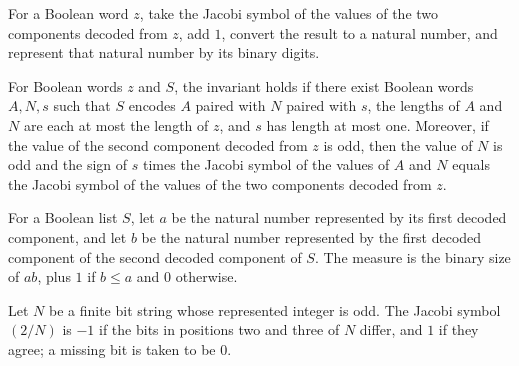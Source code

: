\begin{definition}
\label{Complexity.BinArith.jacobi}
\leanok
{}
For a Boolean word $z$, take the Jacobi symbol of the values of the two components
decoded from $z$, add $1$, convert the result to a natural number, and represent that
natural number by its binary digits.
\end{definition}

\begin{definition}
\label{Complexity.BinArith.JacInv}
\leanok
{}
For Boolean words $z$ and $S$, the invariant holds if there exist Boolean words $A,N,s$
such that $S$ encodes $A$ paired with $N$ paired with $s$, the lengths of $A$ and $N$
are each at most the length of $z$, and $s$ has length at most one. Moreover, if the
value of the second component decoded from $z$ is odd, then the value of $N$ is odd and
the sign of $s$ times the Jacobi symbol of the values of $A$ and $N$ equals the Jacobi
symbol of the values of the two components decoded from $z$.
\end{definition}

\begin{definition}
\label{Complexity.BinArith.jacMeasure}
\leanok
{}
For a Boolean list $S$, let $a$ be the natural number represented by its first decoded
component, and let $b$ be the natural number represented by the first decoded component
of the second decoded component of $S$. The measure is the binary size of $ab$, plus $1$
if $b\le a$ and $0$ otherwise.
\end{definition}

\begin{theorem}
\label{Complexity.BinArith.jacobiSym_two_bits}
\leanok
{}
Let $N$ be a finite bit string whose represented integer is odd. The Jacobi symbol
$(2/N)$ is $-1$ if the bits in positions two and three of $N$ differ, and $1$ if they
agree; a missing bit is taken to be $0$.
\end{theorem}

